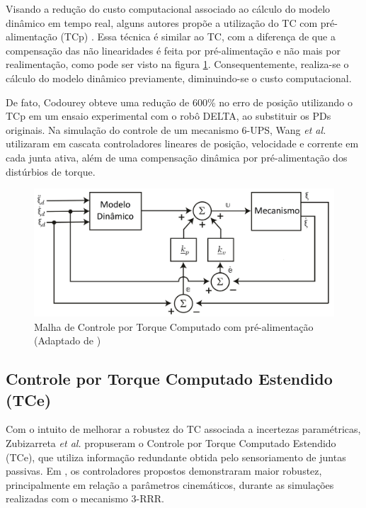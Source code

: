 \documentclass[]{politex}
\begin{document}
Visando a redução do custo computacional associado ao cálculo do modelo dinâmico em tempo real, alguns autores propõe a utilização do TC com pré-alimentação (TCp) \cite{Khalil, Siciliano, Spong}. Essa técnica é similar ao TC, com a diferença de que a compensação das não linearidades é feita por pré-alimentação e não mais por realimentação, como pode ser visto na figura \ref{fig:CTCp}. Consequentemente, realiza-se o cálculo do modelo dinâmico previamente, diminuindo-se o custo computacional.

De fato, Codourey \cite{Codourey} obteve uma redução de 600\% no erro de posição utilizando o TCp em um ensaio experimental com o robô DELTA, ao substituir os PDs originais. Na simulação do controle de um mecanismo 6-UPS, Wang \emph{et al.} \cite{Wang} utilizaram em cascata controladores lineares de posição, velocidade e corrente em cada junta ativa, além de  uma compensação dinâmica por pré-alimentação dos distúrbios de torque.

\begin{figure}[h]
	\centering
	\includegraphics[scale=0.39]{../figures/CTCpnew.jpg}  
	\caption{Malha de Controle por Torque Computado com pré-alimentação (Adaptado de \cite{Craig})}
	\label{fig:CTCp}
\end{figure}

\subsection{Controle por Torque Computado Estendido (TCe)}

Com o intuito de melhorar a robustez do TC associada a incertezas paramétricas, Zubizarreta \emph{et al.} \cite{Zubizarreta, Zubizarreta2, Zubizarreta3, Zubizarreta4} propuseram  o  Controle por Torque Computado Estendido (TCe), que utiliza informação redundante obtida pelo sensoriamento de juntas passivas. Em \cite{Zubizarreta}, os controladores propostos demonstraram maior robustez, principalmente em relação a parâmetros cinemáticos, durante as simulações realizadas com o mecanismo 3-RRR.
\end{document}

